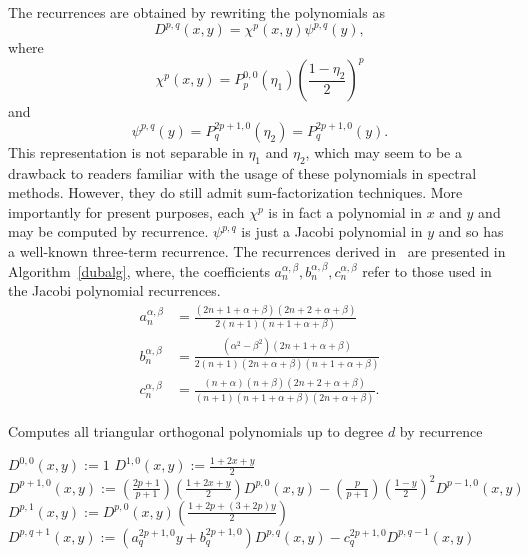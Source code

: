 The recurrences are obtained by rewriting the polynomials as
\[
D^{p,q}(x,y) = \chi^{p}(x,y) \psi^{p,q}(y),
\]
where \[
 \chi^{p}(x,y) = P^{0,0}_p(\eta_1) \left( \frac{1-\eta_2}{2}
\right)^p
\]
and
\[
\psi^{p,q}(y) = P^{2p+1,0}_q(\eta_2) = P^{2p+1,0}_q(y).
\]
This representation is not separable in \( \eta_1 \) and \( \eta_2 \),
which may seem to be a drawback to readers familiar with the usage of
these polynomials in spectral methods.  However, they do still admit
sum-factorization techniques.  More importantly for present purposes,
each \( \chi^p \) is in fact a polynomial in \( x \) and \( y \) and
may be computed by recurrence.  \( \psi^{p,q} \) is just a Jacobi
polynomial in \( y \) and so has a well-known three-term recurrence.
The recurrences derived in~\cite{Kir09} are presented in Algorithm~\ref{dubalg},
where, the coefficients \( a_n^{\alpha,\beta},b_n^{\alpha,\beta},c_n^{\alpha,\beta} \) refer to those  used in the Jacobi polynomial recurrences.
\begin{equation}
\label{eq:recurcoeff}
\begin{split}
a^{\alpha,\beta}_n 
& = \frac{(2n + 1 + \alpha + \beta)(2n + 2 + \alpha + \beta)}
             {2(n+1)(n+1+\alpha+\beta)}\\
b^{\alpha,\beta}_n 
& = \frac{(\alpha^2 -\beta^2)(2n+1+\alpha+\beta)}
             {2(n+1)(2n+\alpha+\beta)(n+1+\alpha+\beta)}\\
c^{\alpha,\beta}_n & = \frac{(n+\alpha)(n+\beta)(2n+2+\alpha+\beta)}
             {(n+1)(n+1+\alpha+\beta)(2n+\alpha+\beta)}.
\end{split}
\end{equation}
\begin{algorithm}
\caption{Computes all triangular orthogonal polynomials up to degree
  \( d \) by recurrence}
\label{dubalg}
\begin{algorithmic}[1]
\State $D^{0,0}(x,y) := 1$
\State $D^{1,0}(x,y) := \frac{1+2x+y}{2}$
\State $D^{p+1,0}(x,y) := \left( \frac{2p+1}{p+1} \right)
\left( \frac{1 + 2x + y}{2} \right) D^{p,0}(x,y)
- \left( \frac{p}{p+1} \right) \left( \frac{1-y}{2} \right)^2
D^{p-1,0}(x,y)$
\EndFor
{}
\State $D^{p,1}(x,y) := D^{p,0}(x,y) \left( \frac{1+2p+(3+2p) y}{2} \right)$
\EndFor
{}
\State $D^{p,q+1}(x,y) :=
\left( a_{q}^{2p+1,0} y + b_q^{2p+1,0} \right) D^{p,q}(x,y)
- c_q^{2p+1,0} D^{p,q-1}(x,y)$
\EndFor
\EndFor
\end{algorithmic}
\end{algorithm}


